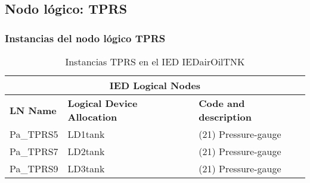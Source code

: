 
\subsection{Nodo l\'ogico: 			 TPRS}

    \subsubsection{Instancias del nodo l\'ogico TPRS}
    \begin{table}[H]
    \begin{center}
    \begin{tabular}{|l|l|p{6.8cm}|}
            \hline
            \multicolumn{3}{|c|}{\cellcolor[gray]{0.8} \textbf{IED Logical Nodes} } \\
            \hline
            \textbf{LN Name} & \textbf{Logical Device Allocation} & \textbf{Code and description} \\
            \hline
            Pa\_TPRS5 & LD1tank & (21) Pressure-gauge \\
            \hline
            Pa\_TPRS7 & LD2tank & (21) Pressure-gauge \\
            \hline
            Pa\_TPRS9 & LD3tank & (21) Pressure-gauge \\
            \hline
    \end{tabular}
    \caption{Instancias TPRS en el IED IEDairOilTNK}
    \label{table:lnInstTPRS_gauge}
    \end{center}
    \end{table}
    
    
    
